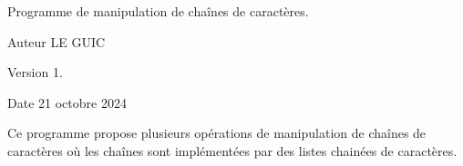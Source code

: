 Programme de manipulation de chaînes de caractères.

\begin{DoxyAuthor}{Auteur}
LE GUIC
\end{DoxyAuthor}
\begin{DoxyVersion}{Version}
1.
\end{DoxyVersion}
\begin{DoxyDate}{Date}
21 octobre 2024
\end{DoxyDate}
Ce programme propose plusieurs opérations de manipulation de chaînes de caractères où les chaînes sont implémentées par des listes chainées de caractères. 